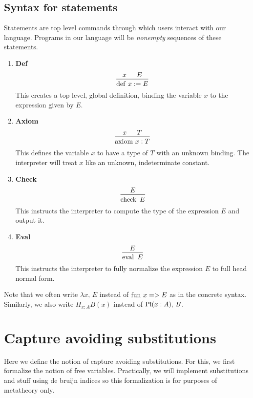 \documentclass{article}
\begin{document}
\subsection{Syntax for statements}
Statements are top level commands through which users interact with our
language. Programs in our language will be \textit{nonempty} sequences of
these statements.

\begin{enumerate}
\item \textbf{Def} \\
\[
  \begin{prooftree}
    \hypo{x}
    \hypo{E}
    \infer2{\deff \, x := E}
  \end{prooftree}
\]
This creates a top level, global definition, binding the variable $x$ to the
expression given by $E$.

\item \textbf{Axiom} \\
\[
  \begin{prooftree}
    \hypo{x}
    \hypo{T}
    \infer2{\axiom \, x : T}
  \end{prooftree}
\]
This defines the variable $x$ to have a type of $T$ with an unknown binding.
The interpreter will treat $x$ like an unknown, indeterminate constant.

\item \textbf{Check} \\
\[
  \begin{prooftree}
    \hypo{E}
    \infer1{\checkk \,\, E}
  \end{prooftree}
\]
This instructs the interpreter to compute the type of the expression $E$ and
output it.

\item \textbf{Eval} \\
\[
  \begin{prooftree}
    \hypo{E}
    \infer1{\evall \,\, E}
  \end{prooftree}
\]
This instructs the interpreter to fully normalize the expression $E$ to full
head normal form.

\end{enumerate}

Note that we often write $\lambda x, \, E$ instead of $\operatorname{fun} \, x => E$ as in the
concrete syntax. Similarly, we also write $\Pi_{x : A}B(x)$ instead of $\operatorname{Pi} (x
: A), \, B$.

\section{Capture avoiding substitutions}
Here we define the notion of capture avoiding substitutions. For this, we first
formalize the notion of free variables.
Practically, we will implement substitutions and stuff using de bruijn indices
so this formalization is for purposes of metatheory only.
\end{document}
